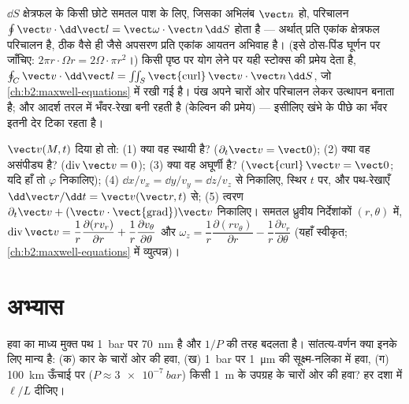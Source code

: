 \begin{remark}[परिचालन क्यों मायने रखता है]\label{rem:b2:fluid-kinematics:stokes}
$\dd S$ क्षेत्रफल के किसी छोटे समतल पाश के लिए, जिसका अभिलंब $\vect n$ हो,
परिचालन $\oint\vect v\cdot\dd\vect l = \vect\omega\cdot\vect n\,\dd S$ होता है ---
अर्थात्  प्रति एकांक क्षेत्रफल परिचालन है, ठीक वैसे ही जैसे
अपसरण प्रति एकांक आयतन अभिवाह है। (इसे ठोस-पिंड
घूर्णन पर जाँचिए: $2\pi r\cdot\Omega r = 2\Omega\cdot\pi r^2$।) किसी पृष्ठ पर योग लेने पर
यही स्टोक्स की प्रमेय देता है, $\oint_C\vect v\cdot\dd\vect l = \iint_S
\operatorname{\vect{curl}}\vect v\cdot\vect n\,\dd S$, जो
\cref{ch:b2:maxwell-equations} में रखी गई है। पंख अपने चारों ओर
परिचालन लेकर उत्थापन बनाता है; और आदर्श तरल में भँवर-रेखा बनी रहती है
(केल्विन की प्रमेय) --- इसीलिए खंभे के पीछे का भँवर
इतनी देर टिका रहता है।
\end{remark}

\begin{method}[कोई वेग क्षेत्र पढ़ना]\label{met:b2:fluid-kinematics:reading}
$\vect v(M, t)$ दिया हो तो: (1) क्या वह स्थायी है? ($\partial_t\vect v = \vect 0$); (2)
क्या वह असंपीड्य है? ($\operatorname{div}\vect v = 0$); (3) क्या वह
अघूर्णी है? ($\operatorname{\vect{curl}}\vect v = \vect 0$; यदि हाँ तो
$\varphi$ निकालिए); (4)  $\dd x/v_x = \dd y/v_y = \dd z/
v_z$ से निकालिए, स्थिर $t$ पर, और पथ-रेखाएँ $\dd\vect r/\dd t = \vect v(\vect r,
t)$ से; (5) त्वरण $\partial_t\vect v + (\vect v\cdot
\operatorname{\vect{grad}})\vect v$ निकालिए। समतल ध्रुवीय निर्देशांकों $(r, \theta)$ में,
$\operatorname{div}\vect v = \dfrac1r\dfrac{\partial(rv_r)}{\partial r} + \dfrac1r
\dfrac{\partial v_\theta}{\partial\theta}$ और $\omega_z = \dfrac1r\dfrac{\partial(rv_\theta)}
{\partial r} - \dfrac1r\dfrac{\partial v_r}{\partial\theta}$ (यहाँ स्वीकृत;
\cref{ch:b2:maxwell-equations} में व्युत्पन्न)।
\end{method}

\section{अभ्यास}

\begin{exercise}[$\star$]\label{exo:b2:fluid-kinematics:1}
हवा का माध्य मुक्त पथ \qty{1}{bar} पर \qty{70}{nm} है और $1/P$ की तरह
बदलता है। सांतत्य-वर्णन क्या इनके लिए मान्य है: (क) कार के चारों ओर की हवा,
(ख) \qty{1}{bar} पर \qty{1}{\micro m} की सूक्ष्म-नलिका में हवा, (ग) \qty{100}{km}
ऊँचाई पर ($P \approx \qty{3e-7}{bar}$) किसी \qty{1}{m} के
उपग्रह के चारों ओर की हवा? हर दशा में $\ell/L$ दीजिए।
\end{exercise}

